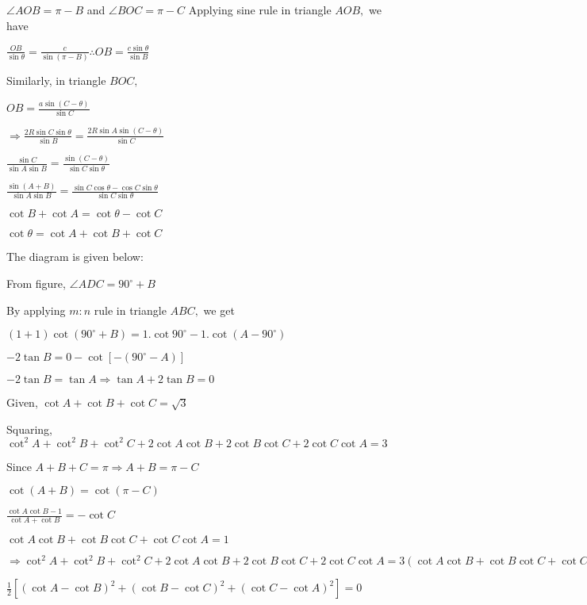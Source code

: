   \startplacefigure
    \externalfigure[18_7.pdf]
  \stopplacefigure

  $\angle AOB = \pi - B$ and $\angle BOC = \pi - C$
  Applying sine rule in triangle $AOB,$ we have

  $\frac{OB}{\sin\theta} = \frac{c}{\sin(\pi - B)} \therefore OB = \frac{c\sin\theta}{\sin B}$

  Similarly, in triangle $BOC,$

  $OB = \frac{a\sin(C - \theta)}{\sin C}$

  $\Rightarrow \frac{2R\sin C\sin\theta}{\sin B} = \frac{2R\sin A\sin(C - \theta)}{\sin C}$

  $\frac{\sin C}{\sin A\sin B} = \frac{\sin(C - \theta)}{\sin C\sin\theta}$

  $\frac{\sin(A + B)}{\sin A\sin B} = \frac{\sin C\cos\theta - \cos C\sin\theta}{\sin C\sin\theta}$

  $\cot B + \cot A = \cot\theta - \cot C$

  $\cot\theta = \cot A + \cot B + \cot C$
\item The diagram is given below:

  \startplacefigure
    \externalfigure[18_8.pdf]
  \stopplacefigure

  From figure, $\angle ADC = 90^\circ + B$

  By applying $m:n$ rule in triangle $ABC,$ we get

  $(1 + 1)\cot(90^\circ + B) = 1.\cot90^\circ - 1.\cot(A-90^\circ)$

  $-2\tan B = 0 - \cot[-(90^\circ - A)]$

  $-2\tan B = \tan A \Rightarrow \tan A + 2\tan B = 0$

\item Given, $\cot A + \cot B + \cot C = \sqrt{3}$

  Squaring, $\cot^2A + \cot^2B + \cot^2C + 2\cot A\cot B + 2\cot B\cot C + 2\cot C\cot A = 3$

  Since $A + B + C = \pi \Rightarrow A + B = \pi - C$

  $\cot(A + B) = \cot(\pi - C)$

  $\frac{\cot A\cot B - 1}{\cot A + \cot B} = -\cot C$

  $\cot A\cot B + \cot B\cot C + \cot C\cot A = 1$

  $\Rightarrow \cot^2A + \cot^2B + \cot^2C + 2\cot A\cot B + 2\cot B\cot C + 2\cot C\cot A = 3(\cot A\cot B + \cot B\cot C +
  \cot C\cot A)$

  $\frac{1}{2}[(\cot A - \cot B)^2 + (\cot B - \cot C)^2 + (\cot C - \cot A)^2] = 0$

